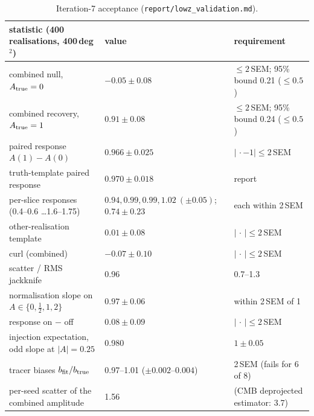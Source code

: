 \documentclass[11pt,a4paper]{article}
\begin{document}
\begin{table}
\centering\footnotesize
\begin{tabular}{lll}
\toprule
statistic (400 realisations, 400\,deg$^2$) & value & requirement\\
\midrule
combined null, $A_{\rm true}=0$ & $-0.05\pm0.08$ & $\le2$\,SEM; 95\% bound 0.21 ($\le0.5$)\\
combined recovery, $A_{\rm true}=1$ & $0.91\pm0.08$ & $\le2$\,SEM; 95\% bound 0.24 ($\le0.5$)\\
paired response $A(1)-A(0)$ & $0.966\pm0.025$ & $|\,\cdot-1|\le2$\,SEM\\
truth-template paired response & $0.970\pm0.018$ & report\\
per-slice responses (0.4--0.6 \ldots 1.6--1.75) & $0.94,0.99,0.99,1.02\ (\pm0.05)$; $0.74\pm0.23$ & each within 2\,SEM\\
other-realisation template & $0.01\pm0.08$ & $|\,\cdot\,|\le2$\,SEM\\
curl (combined) & $-0.07\pm0.10$ & $|\,\cdot\,|\le2$\,SEM\\
scatter / RMS jackknife & 0.96 & 0.7--1.3\\
normalisation slope on $A\in\{0,\tfrac12,1,2\}$ & $0.97\pm0.06$ & within 2\,SEM of 1\\
response on $-$ off & $0.08\pm0.09$ & $|\,\cdot\,|\le2$\,SEM\\
injection expectation, odd slope at $|A|=0.25$ & 0.980 & $1\pm0.05$\\
tracer biases $b_{\rm fit}/b_{\rm true}$ & 0.97--1.01 ($\pm0.002$--$0.004$) & 2\,SEM (fails for 6 of 8)\\
per-seed scatter of the combined amplitude & 1.56 & (CMB deprojected estimator: 3.7)\\
\bottomrule
\end{tabular}
\caption{Iteration-7 acceptance (\texttt{report/lowz\_validation.md}).}
\label{tab:mock}
\end{table}
\end{document}
